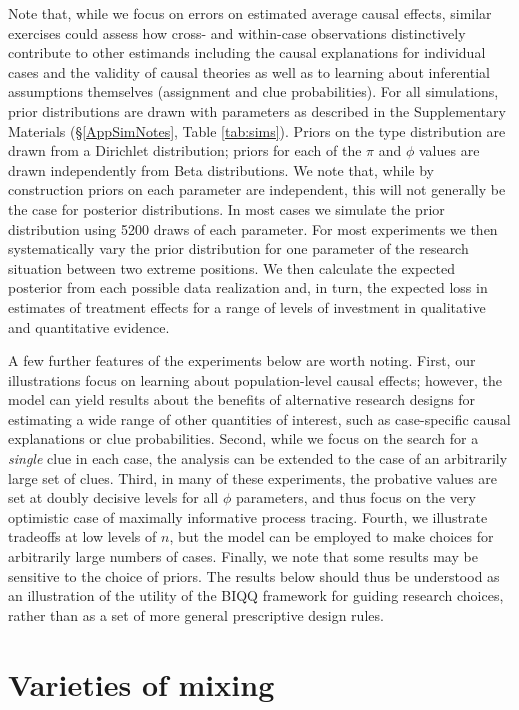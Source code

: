 \documentclass[12pt,]{book}
\begin{document}
Note that, while we focus on errors on estimated average causal effects, similar exercises could assess how cross- and within-case observations distinctively contribute to other estimands \textbar{} including the causal explanations for individual cases and the validity of causal theories \textbar{} as well as to learning about inferential assumptions themselves (assignment and clue probabilities).
For all simulations, prior distributions are drawn with parameters as described in the Supplementary Materials (\S \ref{AppSimNotes}, Table \ref{tab:sims}). Priors on the type distribution are drawn from a Dirichlet distribution; priors for each of the \(\pi\) and \(\phi\) values are drawn independently from Beta distributions. We note that, while by construction priors on each parameter are independent, this will not generally be the case for posterior distributions. In most cases we simulate the prior distribution using 5200 draws of each parameter. For most experiments we then systematically vary the prior distribution for one parameter of the research situation between two extreme positions. We then calculate the expected posterior from each possible data realization and, in turn, the expected loss in estimates of treatment effects for a range of levels of investment in qualitative and quantitative evidence.

A few further features of the experiments below are worth noting. First, our illustrations focus on learning about population-level causal effects; however, the model can yield results about the benefits of alternative research designs for estimating a wide range of other quantities of interest, such as case-specific causal explanations or clue probabilities. Second, while we focus on the search for a \emph{single} clue in each case, the analysis can be extended to the case of an arbitrarily large set of clues. Third, in many of these experiments, the probative values are set at doubly decisive levels for all \(\phi\) parameters, and thus focus on the very optimistic case of maximally informative process tracing. Fourth, we illustrate tradeoffs at low levels of \(n\), but the model can be employed to make choices for arbitrarily large numbers of cases. Finally, we note that some results may be sensitive to the choice of priors. The results below should thus be understood as an illustration of the utility of the BIQQ framework for guiding research choices, rather than as a set of more general prescriptive design rules.

\hypertarget{varieties}{%
\section{Varieties of mixing}\label{varieties}}
\end{document}
